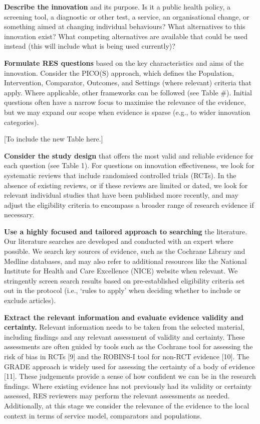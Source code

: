 \documentclass[
  letterpaper,
  DIV=11,
  numbers=noendperiod]{scrreprt}
\begin{document}
\textbf{Describe the innovation} and its purpose. Is it a public health
policy, a screening tool, a diagnostic or other test, a service, an
organisational change, or something aimed at changing individual
behaviours? What alternatives to this innovation exist? What competing
alternatives are available that could be used instead (this will include
what is being used currently)? ~

\textbf{Formulate RES questions} based on the key characteristics and
aims of the innovation. Consider the PICO(S) approach, which defines the
Population, Intervention, Comparator, Outcomes, and Settings (where
relevant) criteria that apply. Where applicable, other frameworks can be
followed (see Table \#). Initial questions often have a narrow focus to
maximise the relevance of the evidence, but we may expand our scope when
evidence is sparse (e.g., to wider innovation categories).

{[}To include the new Table here.{]}

\textbf{Consider the study design} that offers the most valid and
reliable evidence for each question (see Table 1). For questions on
innovation effectiveness, we look for systematic reviews that include
randomised controlled trials (RCTs). In the absence of existing reviews,
or if these reviews are limited or dated, we look for relevant
individual studies that have been published more recently, and may
adjust the eligibility criteria to encompass a broader range of research
evidence if necessary. ~

\textbf{Use a highly focused and tailored approach to searching} the
literature. Our literature searches are developed and conducted with an
expert where possible. We search key sources of evidence, such as the
Cochrane Library and Medline databases, and may also refer to additional
resources like the National Institute for Health and Care Excellence
(NICE) website when relevant. We stringently screen search results based
on pre-established eligibility criteria set out in the protocol (i.e.,
`rules to apply' when deciding whether to include or exclude articles).

\textbf{Extract the relevant information and evaluate evidence validity
and certainty.} Relevant information needs to be taken from the selected
material, including findings and any relevant assessment of validity and
certainty. These assessments are often guided by tools such as the
Cochrane tool for assessing the risk of bias in RCTs {[}9{]} and the
ROBINS-I tool for non-RCT evidence {[}10{]}. The GRADE approach is
widely used for assessing the certainty of a body of evidence {[}11{]}.
These judgements provide a sense of how confident we can be in the
research findings. Where existing evidence has not previously had its
validity or certainty assessed, RES reviewers may perform the relevant
assessments as needed. Additionally, at this stage we consider the
relevance of the evidence to the local context in terms of service
model, comparators and populations.
\end{document}

